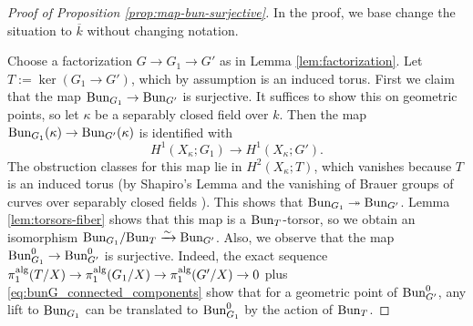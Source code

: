 \documentclass[reqno]{amsart}
\numberwithin{equation}{subsection}
\theoremstyle{definition}
\newcommand\alg{\textup{alg}}
\newcommand{\Bun}{\textup{Bun}}
\newcommand{\ov}{\overline}
\newcommand{\surj}{\twoheadrightarrow}
\begin{document}
\begin{proof}[Proof of Proposition \ref{prop:map-bun-surjective}] In the proof, we base change the situation to $\ov k$ without changing notation.

Choose a factorization $G \rightarrow G_1 \rightarrow G'$ as in Lemma \ref{lem:factorization}. Let $T := \ker(G_1 \rightarrow G')$, which by assumption is an induced torus. First we claim that the map $\Bun_{G_1} \rightarrow \Bun_{G'}$ is surjective. It suffices to show this on geometric points, so let $\kappa$ be a separably closed field over $k$. Then the map $\Bun_{G_1}(\kappa) \rightarrow \Bun_{G'}(\kappa)$ is identified with 
\[
H^1(X_\kappa; G_1) \rightarrow H^1(X_\kappa; G').
\]
The obstruction classes for this map lie in $H^2(X_\kappa; T)$, which vanishes because $T$ is an induced torus (by Shapiro's Lemma and the vanishing of Brauer groups of curves over separably closed fields \cite[Corollary 5.8]{Gro68}). 
This shows that $\Bun_{G_1} \surj \Bun_{G'}$. Lemma \ref{lem:torsors-fiber} shows that this map is a $\Bun_T$-torsor, so we obtain an isomorphism $\Bun_{G_1}/\Bun_T \xrightarrow{\sim} \Bun_{G'}$. Also, we observe that the map $\Bun_{G_1}^0 \rightarrow \Bun_{G'}^0$ is surjective. Indeed, the exact sequence $\pi_1^{\alg}(T/X) \rightarrow \pi_1^{\alg}(G_1/X) \rightarrow \pi_1^{\alg}(G'/X) \rightarrow 0$ plus \eqref{eq:bunG_connected_components} show that for a geometric point of $\Bun_{G'}^0$, any lift to $\Bun_{G_1}$ can be translated to $\Bun_{G_1}^0$ by the action of $\Bun_T$. 


\end{proof}
\end{document}
